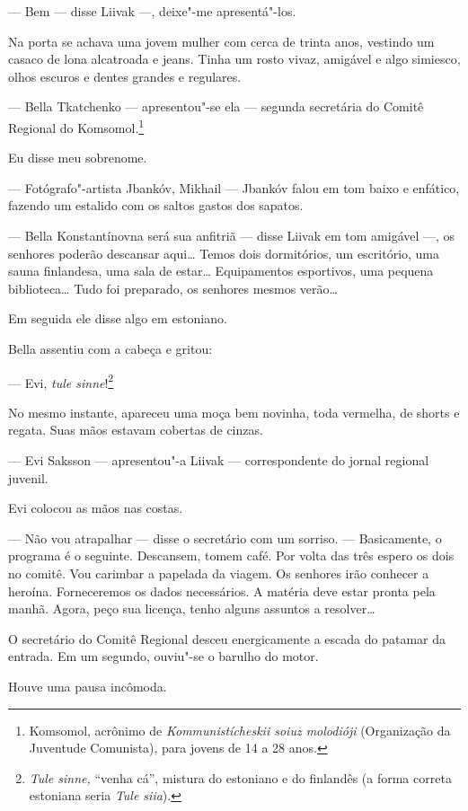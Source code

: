 --- Bem --- disse Liivak ---, deixe"-me
apresentá"-los.

Na porta se achava uma jovem mulher com cerca de trinta anos, vestindo
um casaco de lona alcatroada e jeans. Tinha um rosto vivaz, amigável e
algo simiesco, olhos escuros e dentes grandes e regulares.

--- Bella Tkatchenko --- apresentou"-se ela ---
segunda secretária do Comitê Regional do Komsomol.\footnote{Komsomol,
  acrônimo de \emph{Kommunistícheskii soiuz molodióji} (Organização da
  Juventude Comunista), para jovens de 14 a 28 anos.}

Eu disse meu sobrenome.

--- Fotógrafo"-artista Jbankóv, Mikhail --- Jbankóv falou
em tom baixo e enfático, fazendo um estalido com os saltos gastos dos
sapatos.

--- Bella Konstantínovna será sua anfitriã --- disse
Liivak em tom amigável ---, os senhores poderão descansar aqui\ldots{}
Temos dois dormitórios, um escritório, uma sauna finlandesa, uma sala de
estar\ldots{} Equipamentos esportivos, uma pequena biblioteca\ldots{} Tudo foi
preparado, os senhores mesmos verão\ldots{}

Em seguida ele disse algo em estoniano.

Bella assentiu com a cabeça e gritou:

--- Evi, \emph{tule sinne}!\footnote{\emph{Tule sinne,} ``venha
  cá'', mistura do estoniano e do finlandês (a forma correta estoniana
  seria \emph{Tule siia}).}

No mesmo instante, apareceu uma moça bem novinha, toda vermelha, de
shorts e regata. Suas mãos estavam cobertas de cinzas.

--- Evi Saksson --- apresentou"-a Liivak ---
correspondente do jornal regional juvenil.

Evi colocou as mãos nas costas.

--- Não vou atrapalhar --- disse o secretário com um
sorriso. --- Basicamente, o programa é o seguinte. Descansem,
tomem café. Por volta das três espero os dois no comitê. Vou carimbar a
papelada da viagem. Os senhores irão conhecer a heroína. Forneceremos os
dados necessários. A matéria deve estar pronta pela manhã. Agora, peço
sua licença, tenho alguns assuntos a resolver\ldots{}

O secretário do Comitê Regional desceu energicamente a escada do patamar
da entrada. Em um segundo, ouviu"-se o barulho do motor.

Houve uma pausa incômoda.

